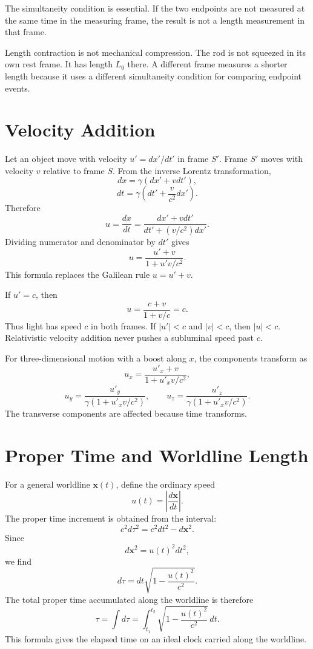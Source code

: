 The simultaneity condition is essential.  If the two endpoints are not measured
at the same time in the measuring frame, the result is not a length measurement
in that frame.

\begin{remarkbox}
Length contraction is not mechanical compression.  The rod is not squeezed in
its own rest frame.  It has length \(L_0\) there.  A different frame measures a
shorter length because it uses a different simultaneity condition for comparing
endpoint events.
\end{remarkbox}

\begin{center}
\end{center}

\clearpage

\section{Velocity Addition}

Let an object move with velocity \(u'=dx'/dt'\) in frame \(S'\).  Frame \(S'\)
moves with velocity \(v\) relative to frame \(S\).  From the inverse Lorentz
transformation,
\[
dx=\gamma(dx'+vdt'),
\]
\[
dt=\gamma\left(dt'+\frac{v}{c^2}dx'\right).
\]
Therefore
\[
u=\frac{dx}{dt}
=\frac{dx'+vdt'}{dt'+(v/c^2)dx'}.
\]
Dividing numerator and denominator by \(dt'\) gives
\[
\boxed{u=\frac{u'+v}{1+u'v/c^2}.}
\]
This formula replaces the Galilean rule \(u=u'+v\).

If \(u'=c\), then
\[
u=\frac{c+v}{1+v/c}=c.
\]
Thus light has speed \(c\) in both frames.  If \(|u'|<c\) and \(|v|<c\), then
\(|u|<c\).  Relativistic velocity addition never pushes a subluminal speed past
\(c\).

For three-dimensional motion with a boost along \(x\), the components transform
as
\[
u_x=\frac{u'_x+v}{1+u'_xv/c^2},
\]
\[
u_y=\frac{u'_y}{\gamma(1+u'_xv/c^2)},
\qquad
u_z=\frac{u'_z}{\gamma(1+u'_xv/c^2)}.
\]
The transverse components are affected because time transforms.

\clearpage

\section{Proper Time and Worldline Length}

For a general worldline \(\mathbf{x}(t)\), define the ordinary speed
\[
u(t)=\left|\frac{d\mathbf{x}}{dt}\right|.
\]
The proper time increment is obtained from the interval:
\[
c^2d\tau^2=c^2dt^2-d\mathbf{x}^2.
\]
Since
\[
d\mathbf{x}^2=u(t)^2dt^2,
\]
we find
\[
d\tau=dt\sqrt{1-\frac{u(t)^2}{c^2}}.
\]
The total proper time accumulated along the worldline is therefore
\[
\tau=\int d\tau
=\int_{t_1}^{t_2}\sqrt{1-\frac{u(t)^2}{c^2}}\,dt.
\]
This formula gives the elapsed time on an ideal clock carried along the
worldline.

